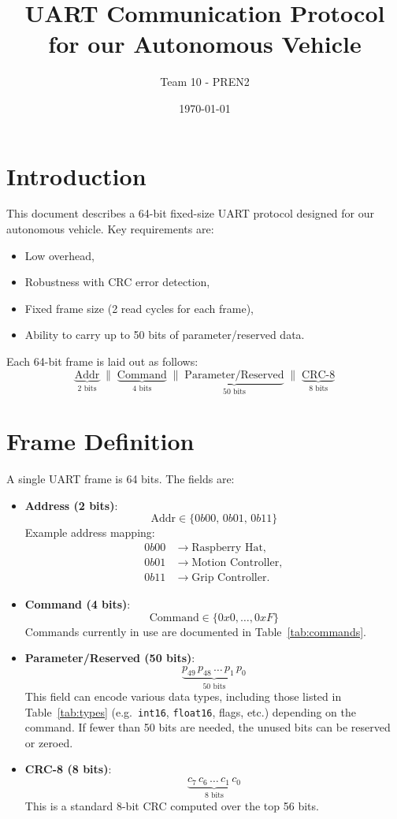 \documentclass[a4paper,11pt]{article}
\begin{document}
\title{UART Communication Protocol for our Autonomous Vehicle}
\author{Team 10 - PREN2}
\date{\today}
\maketitle

\section{Introduction}
This document describes a 64-bit fixed-size UART protocol designed for our autonomous vehicle. Key requirements are:
\begin{itemize}
  \item Low overhead,
  \item Robustness with CRC error detection,
  \item Fixed frame size (2 read cycles for each frame),
  \item Ability to carry up to 50 bits of parameter/reserved data.
\end{itemize}

\bigskip
Each 64-bit frame is laid out as follows:
\[
\underbrace{\text{Addr}}_{2 \text{ bits}}
\;\|\;
\underbrace{\text{Command}}_{4 \text{ bits}}
\;\|\;
\underbrace{\text{Parameter/Reserved}}_{50 \text{ bits}}
\;\|\;
\underbrace{\text{CRC-8}}_{8 \text{ bits}}
\]


\section{Frame Definition}
A single UART frame is 64 bits. The fields are:

\begin{itemize}
  \item \textbf{Address (2 bits)}:
    \[
      \text{Addr} \in \{0b00,\, 0b01,\, 0b11\}
    \]
    Example address mapping:
    \begin{align*}
      0b00 &\rightarrow \text{Raspberry Hat},\\
      0b01 &\rightarrow \text{Motion Controller},\\
      0b11 &\rightarrow \text{Grip Controller}.
    \end{align*}

  \item \textbf{Command (4 bits)}:
    \[
      \text{Command} \in \{ 0x0,\dots,0xF \}
    \]
    Commands currently in use are documented in Table~\ref{tab:commands}.

  \item \textbf{Parameter/Reserved (50 bits)}:
    \[
      \underbrace{p_{49} \, p_{48} \, \dots \, p_{1} \, p_{0}}_{50 \text{ bits}}
    \]
    This field can encode various data types, including those listed in Table~\ref{tab:types} (e.g.\ \texttt{int16}, \texttt{float16}, flags, etc.) depending on the command. If fewer than 50 bits are needed, the unused bits can be reserved or zeroed.

  \item \textbf{CRC-8 (8 bits)}:
    \[
      \underbrace{c_{7}\,c_{6}\,\dots\,c_{1}\,c_{0}}_{8 \text{ bits}}
    \]
    This is a standard 8-bit CRC computed over the top 56 bits.
\end{itemize}
\end{document}
